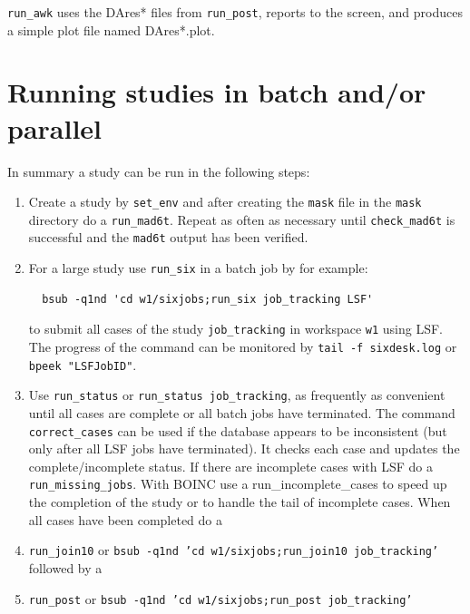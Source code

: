 \documentclass{cernatsnote}    %
\begin{document}
{\tt run\_awk} uses the DAres* files from {\tt run\_post}, reports to the screen,
and produces a simple plot file named DAres*.plot.

\section{Running studies in batch and/or parallel}
In summary a study can be run in the following steps:
\begin{enumerate}
\item Create a study by {\tt set\_env} and after creating the
{\tt mask} file in the {\tt mask} directory do a {\tt run\_mad6t}.
Repeat as often as necessary until {\tt check\_mad6t} is successful
and the {\tt mad6t} output has been verified.
\item For a large study use {\tt run\_six} in a batch job by
for example:
\begin{verbatim}
  bsub -q1nd 'cd w1/sixjobs;run_six job_tracking LSF' 
\end{verbatim}
to submit all cases of the study {\tt job\_tracking} in workspace {\tt w1} using LSF.
The progress of the command can be monitored by
{\tt tail -f sixdesk.log} or {\tt bpeek "LSFJobID"}. 
\item Use {\tt run\_status} or {\tt run\_status job\_tracking}, as frequently 
as convenient until all cases are complete or all batch jobs have terminated.
The command {\tt correct\_cases} can be used if the database appears to be
inconsistent (but only after all LSF jobs have terminated). It checks each case and updates 
the complete/incomplete status. 
If there are incomplete cases with LSF do a {\tt run\_missing\_jobs}. With BOINC use
a run\_incomplete\_cases to speed up the completion of the study or to handle the tail
of incomplete cases. When all cases have been completed do a
\item {\tt run\_join10} or {\tt bsub -q1nd 'cd w1/sixjobs;run\_join10 job\_tracking'} 
followed by a
\item {\tt run\_post} or {\tt bsub -q1nd 'cd w1/sixjobs;run\_post job\_tracking'}
\end{enumerate}
\end{document}
